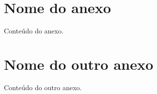 \begin{anexosenv}
\partanexos

\chapter{Nome do anexo}
\label{chap:anexoA}

Conteúdo do anexo.

\chapter{Nome do outro anexo}
\label{chap:anexoB}

Conteúdo do outro anexo.

\end{anexosenv}